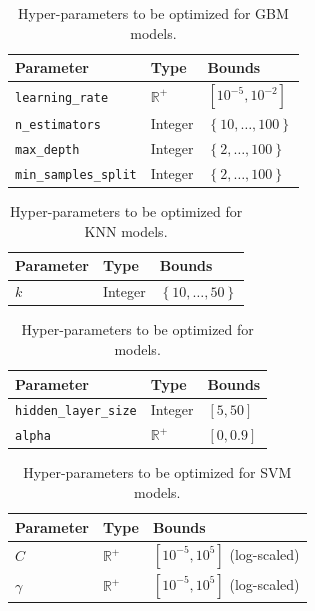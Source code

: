 \documentclass[twoside,11pt]{article}
\begin{document}
\begin{table}[ht]
\centering
\begin{tabular}{@{}lll@{}}
\toprule
\textbf{Parameter}             & \textbf{Type}  & \textbf{Bounds}                          \\ \midrule
\texttt{learning\_rate}      & $\mathbb{R}^+$ & $\left[10^{-5}, 10^{-2}\right]$                         \\
\texttt{n\_estimators}       & Integer        & $\left\lbrace 10,\dots, 100 \right\rbrace$ \\
\texttt{max\_depth}          & Integer        & $\left\lbrace 2, \dots, 100 \right\rbrace$ \\
\texttt{min\_samples\_split}  & Integer        & $\left\lbrace 2, \dots, 100 \right\rbrace$
\end{tabular}
\caption{Hyper-parameters to be optimized for GBM models.}
\label{gbmparam}
\end{table}

\begin{table}[ht]
\centering
\begin{tabular}{@{}lll@{}}
\toprule
\textbf{Parameter} & \textbf{Type} & \textbf{Bounds}                           \\ \midrule
$k$                & Integer       & $\left\lbrace 10, \dots,50 \right\rbrace$
\end{tabular}
\caption{Hyper-parameters to be optimized for KNN models.}
\label{knnparam}
\end{table}

\begin{table}[ht]
\centering
\begin{tabular}{lll}
\hline
\textbf{Parameter}             & \textbf{Type}    & \textbf{Bounds}       \\ \hline
\texttt{hidden\_layer\_size} & Integer          & $\left[5, 50\right]$  \\
\texttt{alpha}               & $\mathbb{R}^{+}$ & $\left[0, 0.9\right]$
\end{tabular}
\caption{Hyper-parameters to be optimized for \MLP models.}
\label{mlpparam}
\end{table}

\begin{table}[ht]
\centering
\begin{tabular}{@{}lll@{}}
\toprule
\textbf{Parameter} & \textbf{Type}                      & \textbf{Bounds}               \\ \midrule
$C$                & $\mathbb{R}^+$ & $\left[ 10^{-5}, 10^{5} \right]$ (log-scaled) \\
$\gamma$           & $\mathbb{R}^+$ & $\left[10^{-5}, 10^{5} \right]$  (log-scaled)       \\ \bottomrule
\end{tabular}
\caption{Hyper-parameters to be optimized for SVM models.}
\label{svmparam}
\end{table}
\end{document}

